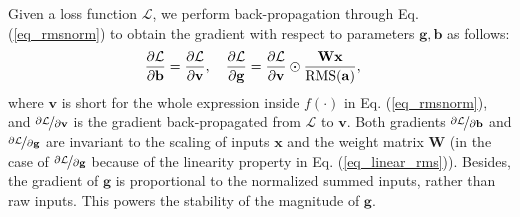 \documentclass{article}
\begin{document}
Given a loss function $\mathcal{L}$, we perform back-propagation through Eq. (\ref{eq_rmsnorm}) to obtain the gradient with respect to parameters $\mathbf{g}, \mathbf{b}$ as follows:
\begin{align}
    \small
    & \frac{\partial \mathcal{L}}{\partial \mathbf{b}} = \frac{\partial \mathcal{L}}{\partial \mathbf{v}},  \quad \frac{\partial \mathcal{L}}{\partial \mathbf{g}} = \frac{\partial \mathcal{L}}{\partial \mathbf{v}} \odot \frac{\mathbf{Wx}}{\text{RMS}(\mathbf{a})},
\end{align}
where $\mathbf{v}$ is short for the whole expression inside $f(\cdot)$ in Eq. (\ref{eq_rmsnorm}), and $\nicefrac{\partial \mathcal{L}}{\partial \mathbf{v}}$ is the gradient back-propagated from $\mathcal{L}$ to $\mathbf{v}$. Both gradients $\nicefrac{\partial \mathcal{L}}{\partial \mathbf{b}}$ and $\nicefrac{\partial \mathcal{L}}{\partial \mathbf{g}}$ are invariant to the scaling of inputs $\mathbf{x}$ and the weight matrix $\mathbf{W}$ (in the case of $\nicefrac{\partial \mathcal{L}}{\partial \mathbf{g}}$ because of the linearity property in Eq. (\ref{eq_linear_rms})). Besides, the gradient of $\mathbf{g}$ is proportional to the normalized summed inputs, rather than raw inputs. This powers the stability of the magnitude of $\mathbf{g}$.
\end{document}
